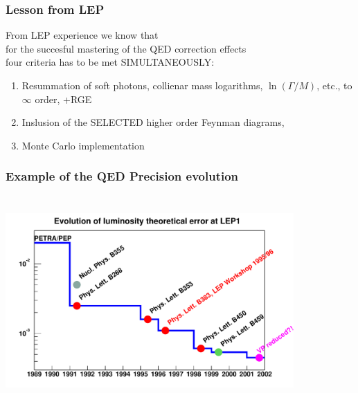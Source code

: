 \documentclass{beamer}
\begin{document}
\begin{frame}[fragile]
\frametitle{\bf Lesson from LEP}

From LEP experience we know that\\
for the succesful mastering of the QED correction effects\\
four criteria has to be met SIMULTANEOUSLY:
\begin{enumerate}
\item
Resummation of soft photons, collienar mass logarithms,
$\ln(\Gamma/M)$, etc., to $\infty$ order, +RGE
\item
Inslusion of the SELECTED higher order Feynman diagrams,
\item
Monte Carlo implementation
\end{enumerate}


\end{frame}


\begin{frame}[fragile]
\frametitle{\bf Example of the QED Precision evolution }

\vspace{-2mm}
{\includegraphics[width=110mm,height=80mm]{cFigA.pdf}}

\end{frame}
\end{document}
